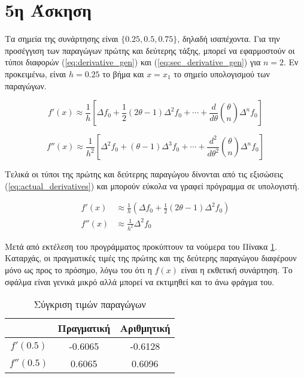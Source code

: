 \documentclass[assignment3.tex]{subfiles}
\begin{document}
\section*{5η Άσκηση}
Τα σημεία της συνάρτησης είναι $\lbrace0.25, 0.5, 0.75\rbrace$, δηλαδή ισαπέχοντα. Για την προσέγγιση των παραγώγων πρώτης και δεύτερης τάξης, μπορεί να εφαρμοστούν οι τύποι διαφορών (\ref{eq:derivative_gen}) και (\ref{eq:sec_derivative_gen}) για $n=2$. Εν προκειμένω, είναι $h=0.25$ το βήμα και $x=x_1$ το σημείο υπολογισμού των παραγώγων.

\begin{equation}
f'(x)\approx \frac{1}{h}\left[\Delta f_0 + \frac{1}{2}(2\theta -1)\Delta^2f_0+\cdots + \frac{d}{d\theta}\binom{\theta}{n}\Delta^nf_0\right]
\label{eq:derivative_gen}
\end{equation}

\begin{equation}
f''(x)\approx \frac{1}{h^2}\left[\Delta^2f_0 + (\theta -1)\Delta^3f_0+\cdots + \frac{d^2}{d\theta^2}\binom{\theta}{n}\Delta^nf_0\right]
\label{eq:sec_derivative_gen}
\end{equation}

Τελικά οι τύποι της πρώτης και δεύτερης παραγώγου δίνονται από τις εξισώσεις (\ref{eq:actual_derivatives}) και μπορούν εύκολα να γραφεί πρόγραμμα σε υπολογιστή.

\begin{equation}
\begin{split}
f'(x)&\approx\frac{1}{h}\left(\Delta f_0 + \frac{1}{2}(2\theta -1)\Delta^2f_0\right)\\
f''(x)&\approx \frac{1}{h^2}\Delta^2f_0
\end{split}
\label{eq:actual_derivatives}
\end{equation}

Μετά από εκτέλεση του προγράμματος προκύπτουν τα νούμερα του Πίνακα \ref{table:derivative_comparison}. Καταρχάς, οι πραγματικές τιμές της πρώτης και της δεύτερης παραγώγου διαφέρουν μόνο ως προς το πρόσημο, λόγω του ότι η $f(x)$ είναι η εκθετική συνάρτηση. Το σφάλμα είναι γενικά μικρό αλλά μπορεί να εκτιμηθεί και το άνω φράγμα του.

\begin{table}[ht]
	\centering
	\begin{tabular}{||c c c||} 
		\hline
		& Πραγματική & Αριθμητική \\ [0.5ex] 
		\hline\hline
		$f'(0.5)$ & -0.6065 & -0.6128 \\ 
		\hline
		$f''(0.5)$ & 0.6065 & 0.6096 \\ [1ex] 
		\hline
	\end{tabular}
	\caption{Σύγκριση τιμών παραγώγων}
	\label{table:derivative_comparison}
\end{table}
\end{document}
